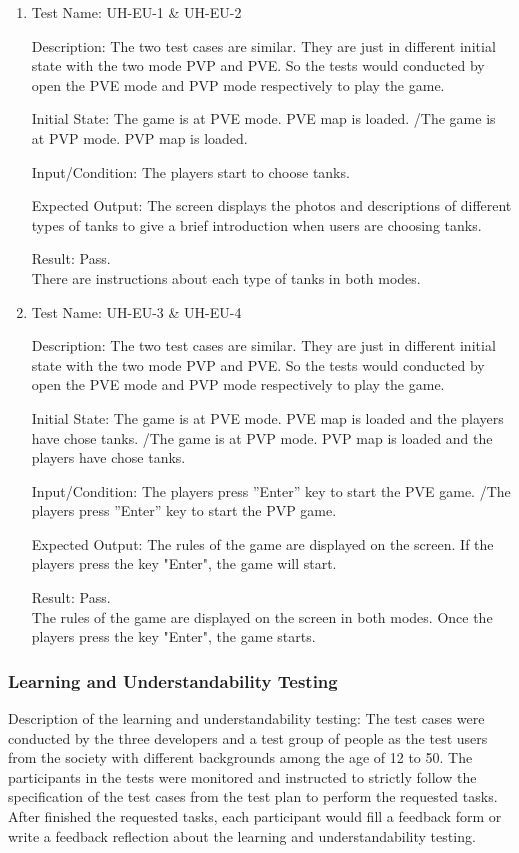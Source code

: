 \documentclass[12pt, titlepage]{article}
\begin{document}
\begin{enumerate}

\item{Test Name: UH-EU-1 \& UH-EU-2\\}

Description: The two test cases are similar. They are just in different initial state with the two mode PVP and PVE. So the tests would conducted by open the PVE mode and PVP mode respectively to play the game.

Initial State: The game is at PVE mode. PVE map is loaded. /The game is at PVP mode. PVP map is loaded.

Input/Condition: The players start to choose tanks.

Expected Output: The screen displays the photos and descriptions of different types of tanks to give a brief introduction when users are choosing tanks.

Result: Pass. \\There are instructions about each type of tanks in both modes.

\item{Test Name: UH-EU-3 \& UH-EU-4\\}

Description: The two test cases are similar. They are just in different initial state with the two mode PVP and PVE. So the tests would conducted by open the PVE mode and PVP mode respectively to play the game.

Initial State: The game is at PVE mode. PVE map is loaded and the players have chose tanks. /The game is at PVP mode. PVP map is loaded and the players have chose tanks.

Input/Condition: The players press ”Enter” key to start the PVE game. /The players press ”Enter” key to start the PVP game.

Expected Output: The rules of the game are displayed on the screen. If the players press the key "Enter", the game will start.

Result: Pass. \\The rules of the game are displayed on the screen in both modes. Once the players press the key "Enter", the game starts.
\end{enumerate}

\subsubsection{Learning and Understandability Testing}
Description of the learning and understandability testing: The test cases were conducted by the three developers and a test group of people as the test users from the society with different backgrounds among the age of 12 to 50. The participants in the tests were monitored and instructed to strictly follow the specification of the test cases from the test plan to perform the requested tasks. After finished the requested tasks, each participant would fill a feedback form or write a feedback reflection about the learning and understandability testing.
\end{document}
